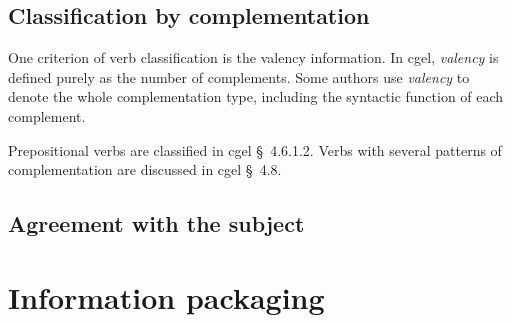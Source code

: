 \documentclass{article}
\newcommand*{\citesec}[1]{\S~{#1}}
\newcommand*{\term}[1]{\emph{#1}}
\begin{document}
\subsection{Classification by complementation}

One criterion of verb classification is the valency information.
In \ac{cgel}, \term{valency} is defined purely as the number of complements.
Some authors use \term{valency} to denote the whole complementation type,
including the syntactic function of each complement.

Prepositional verbs are classified in \ac{cgel} \citesec{4.6.1.2}.
Verbs with several patterns of complementation are discussed in \ac{cgel} \citesec{4.8}.

\subsection{Agreement with the subject}\label{sec:verb-agreement}


\section{Information packaging}





\end{document}
